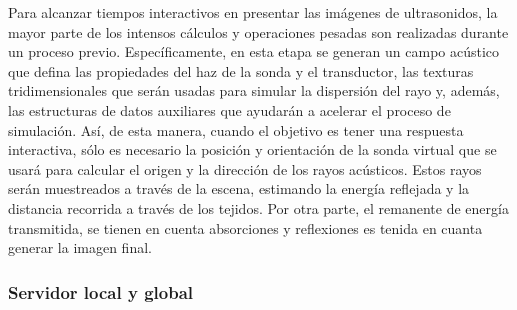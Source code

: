 Para alcanzar tiempos interactivos en presentar las imágenes de ultrasonidos, la mayor parte de los intensos cálculos y operaciones pesadas son realizadas durante un proceso previo. Específicamente, en esta etapa se generan un campo acústico que defina las propiedades del haz de la sonda y el transductor, las texturas tridimensionales que serán usadas para simular la dispersión del rayo y, además, las estructuras de datos auxiliares que ayudarán a acelerar el proceso de simulación.
Así, de esta manera, cuando el objetivo es tener una respuesta interactiva, sólo es necesario la posición y orientación de la sonda virtual que se usará para calcular el origen y la dirección de los rayos acústicos. Estos rayos serán muestreados a través de la escena, estimando la energía reflejada y la distancia recorrida a través de los tejidos. Por otra parte, el remanente de energía transmitida, se tienen en cuenta absorciones y reflexiones es tenida en cuanta generar la imagen final.











\subsubsection{Servidor local y global}

